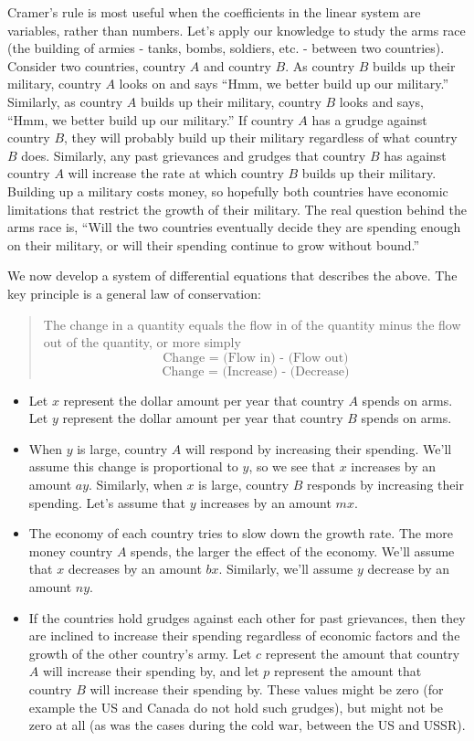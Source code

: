 Cramer's rule is most useful when the coefficients in the linear system are variables, rather than numbers.  
Let's apply our knowledge to study the arms race (the building of armies - tanks, bombs, soldiers, etc. - between two countries).  Consider two countries, country $A$ and country $B$. As country $B$ builds up their military, country $A$ looks on and says ``Hmm, we better build up our military.''  Similarly, as country $A$ builds up their military, country $B$ looks and says, ``Hmm, we better build up our military.''  If country $A$ has a grudge against country $B$, they will probably build up their military regardless of what country $B$ does.  Similarly, any past grievances and grudges that country $B$ has against country $A$ will increase the rate at which country $B$ builds up their military. Building up a military costs money, so hopefully both countries have economic limitations that restrict the growth of their military. The real question behind the arms race is, ``Will the two countries eventually decide they are spending enough on their military, or will their spending continue to grow without bound.''

 We now develop a system of differential equations that describes the above.  The key principle is a general law of conservation:
\begin{quote}
 The change in a quantity equals the flow in of the quantity minus the flow out of the quantity, or more simply 
$$\text{Change = (Flow in) - (Flow out)}$$
$$\text{Change = (Increase) - (Decrease)}$$
\end{quote}
\begin{itemize}
\item Let $x$ represent the dollar amount per year that country $A$ spends on arms. Let $y$ represent the dollar amount per year that country $B$ spends on arms.  
\item When $y$ is large, country $A$ will respond by increasing their spending.  
We'll assume this change is proportional to $y$, so we see that $x$ increases by an amount $ay$. 
 Similarly, when $x$ is large, country $B$ responds by increasing their spending. Let's assume that $y$ increases by an amount $mx$.
\item The economy of each country tries to slow down the growth rate.  The more money country $A$ spends, the larger the effect of the economy.  We'll assume that $x$ decreases by an amount $bx$.  Similarly, we'll assume $y$ decrease by an amount $ny$.
\item If the countries hold grudges against each other for past grievances, then they are inclined to increase their spending regardless of economic factors and the growth of the other country's army.  Let $c$ represent the amount that country $A$ will increase their spending by, and let $p$ represent the amount that country $B$ will increase their spending by. These values might be zero (for example the US and Canada do not hold such grudges), but might not be zero at all (as was the cases during the cold war, between the US and USSR).
\end{itemize}

